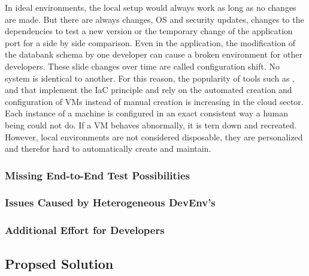 \documentclass[12pt, a4paper]{article}
\begin{document}
        In ideal environments, the local setup would always work as long as no changes are made. But there are always changes, \ac{OS} and security updates, changes to the dependencies to test a new version or the temporary change of the application port for a side by side comparison. Even in the application, the modification of the databank schema by one developer can cause a broken environment for other developers. These slide changes over time are called configuration shift. No system is identical to another. For this reason, the popularity of tools such as ,  and  that implement the \ac{IaC} principle and rely on the automated creation and configuration of VMs instead of manual creation is increasing in the cloud sector. Each instance of a machine is configured in an exact consistent way a human being could not do. If a \ac{VM} behaves abnormally, it is tern down and recreated. However, local environments are not considered disposable, they are personalized and therefor hard to automatically create and maintain.
        \subsubsection{Missing End-to-End Test Possibilities}
        \subsubsection{Issues Caused by Heterogeneous \acs{DevEnv}'s} %
        \subsubsection{Additional Effort for Developers}
    \subsection{Propsed Solution}\newpage

\end{document}
